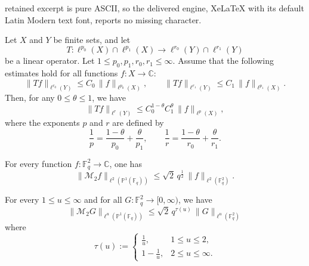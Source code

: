 \documentclass[10pt,a4paper]{amsart}
\begin{document}
retained excerpt is pure ASCII, so the delivered engine, XeLaTeX with its default Latin Modern text font, reports no missing character.
\begin{lemma}\label{interpolation-inequality}
Let $X$ and $Y$ be finite sets, and let
\[
T : \ell^{p_0}(X) \cap \ell^{p_1}(X)\longrightarrow \ell^{r_0}(Y) \cap \ell^{r_1}(Y)
\]
be a linear operator.
Let $1 \le p_0, p_1, r_0, r_1 \le \infty$.
Assume that the following estimates hold for all functions $f : X \to \mathbb{C}$:
\[
\|Tf\|_{\ell^{r_0}(Y)} \le C_0 \, \|f\|_{\ell^{p_0}(X)},
\qquad
\|Tf\|_{\ell^{r_1}(Y)} \le C_1 \, \|f\|_{\ell^{p_1}(X)}.
\]
Then, for any $0 \le \theta \le 1$, we have
\[
\|Tf\|_{\ell^{r}(Y)} \le C_0^{1-\theta} C_1^{\theta} \, \|f\|_{\ell^{p}(X)},
\]
where the exponents $p$ and $r$ are defined by
\[
\frac{1}{p} = \frac{1-\theta}{p_0} + \frac{\theta}{p_1},
\qquad
\frac{1}{r} = \frac{1-\theta}{r_0} + \frac{\theta}{r_1}.
\]
\end{lemma}

\begin{lemma}\label{lem:planar-l2}
For every function $f:\mathbb{F}_q^2\to\mathbb{C}$, one has
\[
\|\mathcal{M}_{2}f\|_{\ell^2(\mathbb{P}^{1}(\mathbb{F}_q))}
\le
\sqrt{2}\,q^{\frac{1}{2}}\,\|f\|_{\ell^2(\mathbb{F}_q^2)}.
\]
\end{lemma}

\begin{theorem}
\label{thm:planar-all-u}
For every $1\le u\le\infty$ and for all $G:\mathbb{F}_q^2\to[0,\infty)$, we have 
\[
\|\mathcal{M}_{2}G\|_{\ell^u(\mathbb{P}^1(\mathbb{F}_q))}
\le \sqrt{2}
\,q^{\tau(u)}\,\|G\|_{\ell^u(\mathbb{F}_q^2)}
\]
where
\[
\tau(u):=
\begin{cases}
\displaystyle \frac1u, & 1\le u\le 2,\\[0.4em]
\displaystyle 1-\frac1u, & 2\le u\le \infty.
\end{cases}
\]
\end{theorem}
\end{document}
